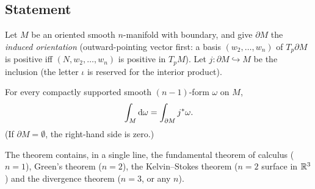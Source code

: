 \subsection{Statement}

Let $M$ be an oriented smooth $n$-manifold with boundary, and give $\partial M$ the \emph{induced orientation} (outward-pointing vector first: a basis $(w_2,\dots,w_n)$ of $T_p\partial M$ is positive iff $(N,w_2,\dots,w_n)$ is positive in $T_pM$). Let $j:\partial M\hookrightarrow M$ be the inclusion (the letter $\iota$ is reserved for the interior product).

\begin{theorem}\label{thm:stokes}
For every compactly supported smooth $(n-1)$-form $\omega$ on $M$,
\begin{equation}\label{eq:stokes}
\int_M\mathrm{d}\omega=\int_{\partial M}j{}^{*}\omega .
\end{equation}
(If $\partial M=\emptyset$, the right-hand side is zero.)
\end{theorem}

The theorem contains, in a single line, the fundamental theorem of calculus ($n=1$), Green's theorem ($n=2$), the Kelvin--Stokes theorem ($n=2$ surface in $\mathbb{R}^3$) and the divergence theorem ($n=3$, or any $n$).
